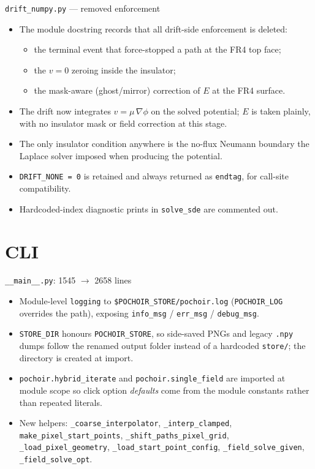 \documentclass[10pt,aspectratio=169]{beamer}
\newcommand{\ti}[1]{\texttt{\footnotesize #1}}
\begin{document}
\begin{frame}{\texttt{drift\_numpy.py} --- removed enforcement}
  \begin{itemize}\small
  \item The module docstring records that all drift-side enforcement is deleted:
    \begin{itemize}
    \item the terminal event that force-stopped a path at the FR4 top face;
    \item the $v=0$ zeroing inside the insulator;
    \item the mask-aware (ghost/mirror) correction of $E$ at the FR4 surface.
    \end{itemize}
  \item The drift now integrates $v=\mu\,\nabla\phi$ on the solved potential; $E$ is taken
        plainly, with no insulator mask or field correction at this stage.
  \item The only insulator condition anywhere is the no-flux Neumann boundary the Laplace
        solver imposed when producing the potential.
  \item \ti{DRIFT\_NONE = 0} is retained and always returned as \ti{endtag}, for call-site
        compatibility.
  \item Hardcoded-index diagnostic prints in \ti{solve\_sde} are commented out.
  \end{itemize}
\end{frame}

\section{CLI}

\begin{frame}{\texttt{\_\_main\_\_.py}: 1545 $\rightarrow$ 2658 lines}
  \begin{itemize}\small
  \item Module-level \ti{logging} to \ti{\$POCHOIR\_STORE/pochoir.log}
        (\ti{POCHOIR\_LOG} overrides the path), exposing
        \ti{info\_msg} / \ti{err\_msg} / \ti{debug\_msg}.
  \item \ti{STORE\_DIR} honours \ti{POCHOIR\_STORE}, so side-saved PNGs and legacy
        \ti{.npy} dumps follow the renamed output folder instead of a hardcoded
        \ti{store/}; the directory is created at import.
  \item \ti{pochoir.hybrid\_iterate} and \ti{pochoir.single\_field} are imported at module
        scope so click option \emph{defaults} come from the module constants rather than
        repeated literals.
  \item New helpers: \ti{\_coarse\_interpolator}, \ti{\_interp\_clamped},
        \ti{make\_pixel\_start\_points}, \ti{\_shift\_paths\_pixel\_grid},
        \ti{\_load\_pixel\_geometry}, \ti{\_load\_start\_point\_config},
        \ti{\_field\_solve\_given}, \ti{\_field\_solve\_opt}.
  \end{itemize}
\end{frame}
\end{document}
